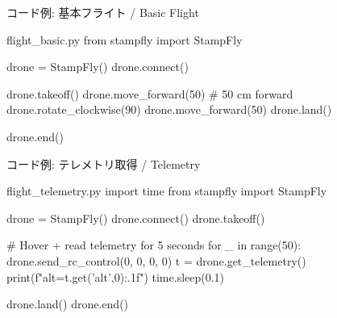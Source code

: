 \begin{frame}[fragile]{コード例: 基本フライト / Basic Flight}
  \begin{sflisting}[language=Python]{flight\_basic.py}
from stampfly import StampFly

drone = StampFly()
drone.connect()

drone.takeoff()
drone.move_forward(50)    # 50 cm forward
drone.rotate_clockwise(90)
drone.move_forward(50)
drone.land()

drone.end()
  \end{sflisting}
\end{frame}

\begin{frame}[fragile]{コード例: テレメトリ取得 / Telemetry}
  \begin{sflisting}[language=Python]{flight\_telemetry.py}
import time
from stampfly import StampFly

drone = StampFly()
drone.connect()
drone.takeoff()

# Hover + read telemetry for 5 seconds
for _ in range(50):
    drone.send_rc_control(0, 0, 0, 0)
    t = drone.get_telemetry()
    print(f"alt={t.get('alt',0):.1f}")
    time.sleep(0.1)

drone.land()
drone.end()
  \end{sflisting}
\end{frame}

